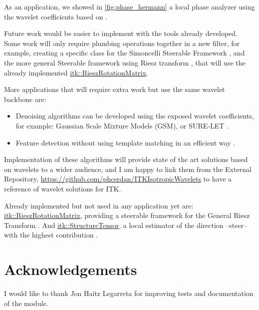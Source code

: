 \documentclass{InsightArticle}
\newcommand{\github}[1]{\href{https://github.com/phcerdan/ITKIsotropicWavelets/blob/master/include/itk#1.h}{itk::#1}}
\theoremstyle{definition}
\begin{document}
As an application, we showed in \autoref{fig:phase_hermann} a local phase analyzer using the wavelet coefficients based on \cite{held_steerable_2010}.

Future work would be easier to implement with the tools already developed. Some work will only require plumbing operations together in a new filter, for example, creating a specific class for the Simoncelli Steerable Framework \cite{simoncelli_steerable_1995}, and the more general Steerable framework using Riesz transform \cite{unser_steerable_2011}, that will use the already implemented \github{RieszRotationMatrix}.

More applications that will require extra work but use the same wavelet backbone are:
\begin{itemize}[topsep=0pt]
  \item Denoising algorithms can be developed using the exposed wavelet coefficients, for example: Gaussian Scale Mixture Models (GSM)\cite{portilla_image_2003}, or SURE-LET \cite{blu_sure-let_2007}.
  \item Feature detection without using template matching in an efficient way \cite{puspoki_template-free_2015}.
\end{itemize}

 Implementation of these algorithms will provide state of the art solutions based on wavelets to a wider audience, and I am happy to link them from the External Repository, \url{https://github.com/phcerdan/ITKIsotropicWavelets} to have a reference of wavelet solutions for ITK.

 Already implemented but not used in any application yet are: \github{RieszRotationMatrix}, providing a steerable framework for the General Riesz Transform \cite{unser_steerable_2011}. And \github{StructureTensor}, a local estimator of the direction --steer-- with the highest contribution \cite{chenouard_3d_2012}.

\section{Acknowledgements}
\label{sec:Acknow}
I would like to thank Jon Haitz Legarreta for improving tests and documentation of the module.

%

%
%
\twocolumn

\onecolumn
\end{document}
